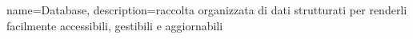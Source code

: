 {
	name={Database},
	description={raccolta organizzata di dati strutturati per renderli facilmente accessibili, gestibili e aggiornabili}
}